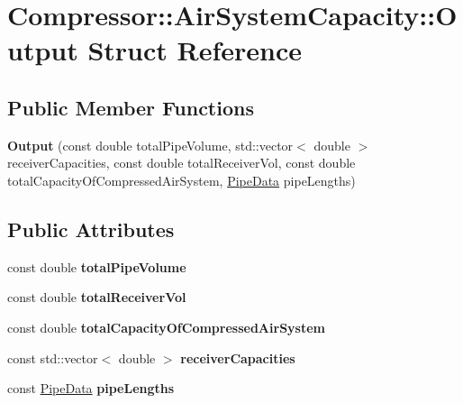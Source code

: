 \hypertarget{struct_compressor_1_1_air_system_capacity_1_1_output}{}\section{Compressor\+:\+:Air\+System\+Capacity\+:\+:Output Struct Reference}
\label{struct_compressor_1_1_air_system_capacity_1_1_output}
\subsection*{Public Member Functions}
\begin{DoxyCompactItemize}
\item 
\mbox{\label{struct_compressor_1_1_air_system_capacity_1_1_output_ab4065e716b526f38cc310fcec579afde}} 
{\bfseries Output} (const double total\+Pipe\+Volume, std\+::vector$<$ double $>$ receiver\+Capacities, const double total\+Receiver\+Vol, const double total\+Capacity\+Of\+Compressed\+Air\+System, \hyperlink{struct_compressor_1_1_pipe_data}{Pipe\+Data} pipe\+Lengths)
\end{DoxyCompactItemize}
\subsection*{Public Attributes}
\begin{DoxyCompactItemize}
\item 
\mbox{\label{struct_compressor_1_1_air_system_capacity_1_1_output_aa6eebf63d38ed5cb2943e6ef0d00d326}} 
const double {\bfseries total\+Pipe\+Volume}
\item 
\mbox{\label{struct_compressor_1_1_air_system_capacity_1_1_output_a442171a72537e1c9057f03db3f08a39a}} 
const double {\bfseries total\+Receiver\+Vol}
\item 
\mbox{\label{struct_compressor_1_1_air_system_capacity_1_1_output_a9f81c36e0dfea5574d2e6279b928e288}} 
const double {\bfseries total\+Capacity\+Of\+Compressed\+Air\+System}
\item 
\mbox{\label{struct_compressor_1_1_air_system_capacity_1_1_output_abb4c6d9da5e99160ca9ee8fc1b41a311}} 
const std\+::vector$<$ double $>$ {\bfseries receiver\+Capacities}
\item 
\mbox{\label{struct_compressor_1_1_air_system_capacity_1_1_output_a1a2fe0406a4ff682d7141df7b5e4b150}} 
const \hyperlink{struct_compressor_1_1_pipe_data}{Pipe\+Data} {\bfseries pipe\+Lengths}
\end{DoxyCompactItemize}


